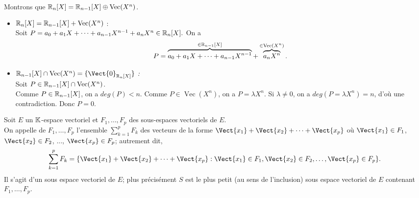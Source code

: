 \documentclass{book}
\begin{document}
\begin{Exemple}
Montrons que $\mathbb{R}_n[X]=\mathbb{R}_{n-1}[X]\oplus \operatorname{Vec} (X^n)$.\\
\begin{itemize}
\item \textit{$\mathbb{R}_n[X]=\mathbb{R}_{n-1}[X]+ \operatorname{Vec} (X^n) $} :\\
Soit $P =a_0+a_1 X+\dots+a_{n-1} X^{n-1}+a_{n} X^{n}\in \mathbb{R}_n[X].$
On a $$P =\overbrace{a_0+a_1 X+\dots+a_{n-1} X^{n-1}}^{\in \mathbb{R}_{n-1}[X]}+\overbrace{a_{n} X^{n}}^{\in \operatorname{Vec} (X^n)}.$$
\item \textit{$\R_{n-1}[X]\cap  \operatorname{Vec} (X^n)=\{\Vect{0}_{\R_n[X]}\}$ :}\\
Soit $P \in \mathbb{R}_{n-1}[X]\cap \operatorname{Vec} (X^n)$.\\
Comme $P \in \mathbb{R}_{n-1}[X]$, on a $deg(P)<n$. Comme  $P \in \operatorname{Vec} (X^n)$, on a $P=\lambda X^n$. Si $\lambda\neq 0$, on a $deg(P=\lambda X^n)=n$, d'où une contradiction.  Donc $P=0$.  
\end{itemize}
\end{Exemple}
\begin{DefinitionProposition}[Somme]
Soit $E$ un $\mathbb{K}$-espace vectoriel et $F_1,\dots, F_p$ des sous-espaces vectoriels de $E$.\\
On appelle  de $F_1,\dots, F_p$ l'ensemble $ \sum_{k=1}^p F_k$ des vecteurs de la forme $\Vect{x_1} +\Vect{x_2}+ \dots + \Vect{x_p}$
où $\Vect{x_1}\in F_1$, $\Vect{x_2}\in F_2$, ..., $\Vect{x_p}\in F_p$;
autrement dit,
\[  \sum_{k=1}^p F_k = \{ \Vect{x_1} +\Vect{x_2}+ \dots + \Vect{x_p}: \Vect{x_1}\in F_1,\Vect{x_2}\in F_2,\dots, \Vect{x_p}\in F_p\}. \]
Il s'agit d'un sous espace vectoriel  de $E$;
plus précisément $S$ est le plus petit (au sens de l'inclusion) sous espace vectoriel  de $E$ contenant $F_1,\dots, F_p$.
\end{DefinitionProposition}
\end{document}
